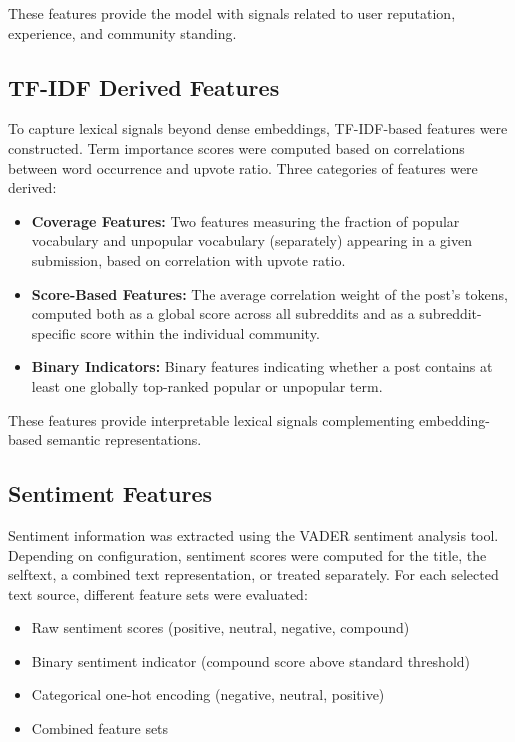 These features provide the model with signals related to user reputation, experience, and community standing.

\subsection{TF-IDF Derived Features}

To capture lexical signals beyond dense embeddings, TF-IDF-based features were constructed. Term importance scores were computed based on correlations between word occurrence and upvote ratio.
Three categories of features were derived:

\begin{itemize}
    \item \textbf{Coverage Features:} Two features measuring the fraction of popular vocabulary and unpopular vocabulary (separately) appearing in a given submission, based on correlation with upvote ratio.
    \item \textbf{Score-Based Features:} The average correlation weight of the post's tokens, computed both as a global score across all subreddits and as a subreddit-specific score within the individual community.
    \item \textbf{Binary Indicators:} Binary features indicating whether a post contains at least one globally top-ranked popular or unpopular term.
\end{itemize}

These features provide interpretable lexical signals complementing embedding-based semantic representations.

\subsection{Sentiment Features}

Sentiment information was extracted using the VADER sentiment analysis tool. Depending on configuration, sentiment scores were computed for the title, the selftext, a combined text representation, or treated separately.
For each selected text source, different feature sets were evaluated:

\begin{itemize}
    \item Raw sentiment scores (positive, neutral, negative, compound)
    \item Binary sentiment indicator (compound score above standard threshold)
    \item Categorical one-hot encoding (negative, neutral, positive)
    \item Combined feature sets
\end{itemize}

